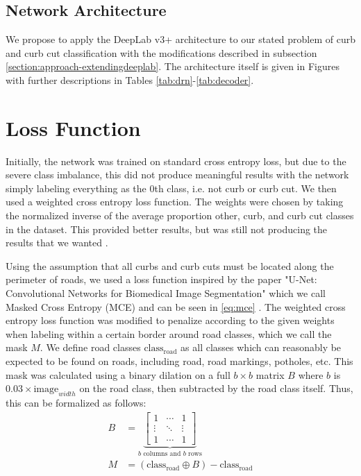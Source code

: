 \subsection{Network Architecture}\label{section:approach-networkarchitecture}
We propose to apply the DeepLab v3+ architecture to our stated problem of curb and curb cut classification with the modifications described in subsection \ref{section:approach-extendingdeeplab}.
The architecture itself is given in Figures  with further descriptions in Tables \ref{tab:drn}-\ref{tab:decoder}.






\section{Loss Function}\label{section:approach-lossfunction}
Initially, the network was trained on standard cross entropy loss, but due to the severe class imbalance, this did not produce meaningful results with the network simply labeling everything as the 0th class, i.e. not curb or curb cut.
We then used a weighted cross entropy loss function.
The weights were chosen by taking the normalized inverse of the average proportion other, curb, and curb cut classes in the dataset.
This provided better results, but was still not producing the results that we wanted .

Using the assumption that all curbs and curb cuts must be located along the perimeter of roads, we used a loss function inspired by the paper "U-Net: Convolutional Networks for Biomedical Image Segmentation" which we call Masked Cross Entropy (MCE) and can be seen in \eqref{eq:mce} \cite{unet}.
The weighted cross entropy loss function was modified to penalize according to the given weights when labeling within a certain border around road classes, which we call the mask $M$.
We define road classes $\text{class}_{\text{road}}$ as all classes which can reasonably be expected to be found on roads, including road, road markings, potholes, etc.
This mask was calculated using a binary dilation on a full $b \times b$ matrix $B$ where $b$ is $0.03 \times \text{image}_{width}$ on the road class, then subtracted by the road class itself.
Thus, this can be formalized as follows:
\begin{align}
	B &= \underbrace{
			\begin{bmatrix}
				1  & \cdots & 1\\ 
				\vdots &  \ddots & \vdots\\ 
				1 &  \cdots & 1
				\end{bmatrix}}_{b \text{ columns and } b \text{ rows}} \\
	M &= \left(\text{class}_{\text{road}} \oplus B\right) - \text{class}_{\text{road}}
\end{align}

